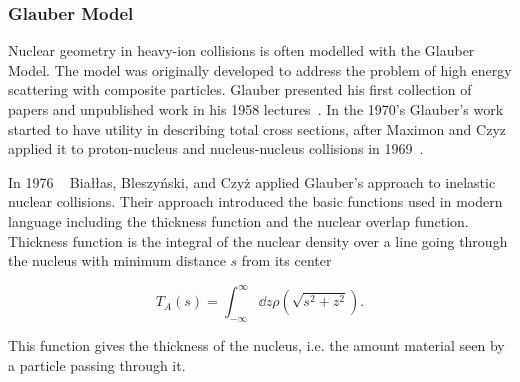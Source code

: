 


\subsubsection{Glauber Model}
\label{sec:glauber}
Nuclear geometry in heavy-ion collisions is often modelled with the Glauber Model. The model was originally developed to address the problem of high energy scattering with composite particles. Glauber presented his first collection of papers and unpublished work in his 1958 lectures~\cite{Glauber:1959}. In the 1970's Glauber's work started to have utility in describing total cross sections, after Maximon and Czyz applied it to proton-nucleus and nucleus-nucleus collisions in 1969~\cite{Czyz:1969}. 

In 1976 ~\cite{Biallas1976461} Białłas, Bleszyński, and Czyż applied Glauber's approach to inelastic nuclear collisions. Their approach introduced the basic functions used in modern language including the thickness function and the nuclear overlap function. Thickness function is the integral of the nuclear density over a line going through the nucleus with minimum distance $s$ from its center

\begin{equation}
T_A\left(s\right)=\int_{-\infty}^{\infty}\dd z \rho\left(\sqrt{s^2+z^2}\right).
\end{equation}

\noindent This function gives the thickness of the nucleus, i.e. the amount material seen by a particle passing through it. 

